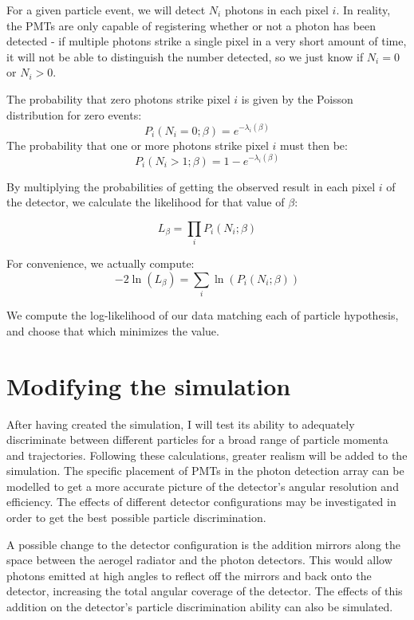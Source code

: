 For a given particle event, we will detect $N_i$ photons in each pixel $i$.
In reality, the PMTs are only capable of registering whether or not a photon has been detected - if multiple photons strike a single pixel in a very short amount of time, it will not be able to distinguish the number detected, so we just know if $N_i = 0$ or $N_i > 0$.

The probability that zero photons strike pixel $i$ is given by the Poisson distribution for zero events:
$$ P_i(N_i=0; \beta) = e^{-\lambda_i(\beta)} $$
 The probability that one or more photons strike pixel $i$ must then be:
$$ P_i(N_i>1; \beta) = 1 - e^{-\lambda_i(\beta)} $$

By multiplying the probabilities of getting the observed result in each pixel $i$ of the detector, we calculate the likelihood for that value of $\beta$:

$$L_\beta = \prod_{i}P_i(N_i; \beta)$$

For convenience, we actually compute:
\begin{equation}
    \label{eq:loglikelihood}
    -2\ln(L_\beta) = \sum_i \ln(P_i(N_i; \beta))
\end{equation}


We compute the log-likelihood of our data matching each of particle hypothesis, and choose that which minimizes the value.

\section{Modifying the simulation}
After having created the simulation, I will test its ability to adequately discriminate between different particles for a broad range of particle momenta and trajectories. Following these calculations, greater realism will be added to the simulation.
The specific placement of PMTs in the photon detection array can be modelled to get a more accurate picture of the detector's angular resolution and efficiency.
The effects of different detector configurations may be investigated in order to get the best possible particle discrimination. 

A possible change to the detector configuration is the addition mirrors along the space between the aerogel radiator and the photon detectors.
This would allow photons emitted at high angles to reflect off the mirrors and back onto the detector, increasing the total angular coverage of the detector. 
The effects of this addition on the detector's particle discrimination ability can also be simulated.




\endinput

Any text after an \endinput is ignored.
You could put scraps here or things in progress.

